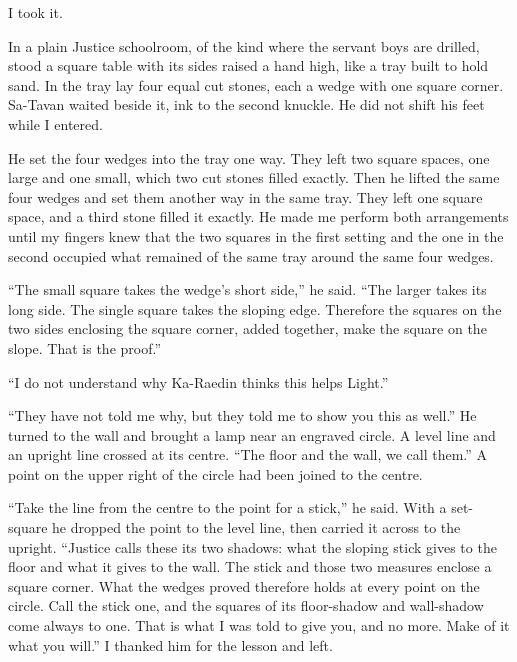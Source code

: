 I took it.\par

In a plain Justice schoolroom, of the kind where the servant boys are drilled, stood a square table with its sides raised a hand high, like a tray built to hold sand. In the tray lay four equal cut stones, each a wedge with one square corner. Sa-Tavan waited beside it, ink to the second knuckle. He did not shift his feet while I entered.\par

He set the four wedges into the tray one way. They left two square spaces, one large and one small, which two cut stones filled exactly. Then he lifted the same four wedges and set them another way in the same tray. They left one square space, and a third stone filled it exactly. He made me perform both arrangements until my fingers knew that the two squares in the first setting and the one in the second occupied what remained of the same tray around the same four wedges.\par

``The small square takes the wedge's short side,'' he said. ``The larger takes its long side. The single square takes the sloping edge. Therefore the squares on the two sides enclosing the square corner, added together, make the square on the slope. That is the proof.''\par

``I do not understand why Ka-Raedin thinks this helps Light.''\par

``They have not told me why, but they told me to show you this as well.'' He turned to the wall and brought a lamp near an engraved circle. A level line and an upright line crossed at its centre. ``The floor and the wall, we call them.'' A point on the upper right of the circle had been joined to the centre.\par

``Take the line from the centre to the point for a stick,'' he said. With a set-square he dropped the point to the level line, then carried it across to the upright. ``Justice calls these its two shadows: what the sloping stick gives to the floor and what it gives to the wall. The stick and those two measures enclose a square corner. What the wedges proved therefore holds at every point on the circle. Call the stick one, and the squares of its floor-shadow and wall-shadow come always to one. That is what I was told to give you, and no more. Make of it what you will.'' I thanked him for the lesson and left.\par

